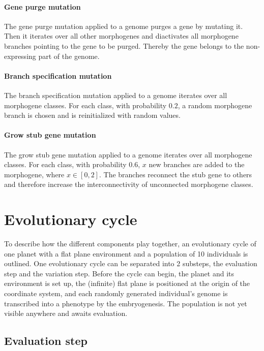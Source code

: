 \documentclass[main]{subfiles}
\begin{document}
\paragraph{Gene purge mutation}

The gene purge mutation applied to a genome purges a gene by mutating it. %
%
Then it iterates over all other morphogenes and diactivates all morphogene branches pointing to the gene to be purged. %
%
Thereby the gene belongs to the non-expressing part of the genome.

\paragraph{Branch specification mutation}

The branch specification mutation applied to a genome iterates over all morphogene classes. %
%
For each class, with probability $0.2$, a random morphogene branch is chosen and is reinitialized with random values. 

\paragraph{Grow stub gene mutation}

The grow stub gene mutation applied to a genome iterates over all morphogene classes. %
%
For each class, with probability $0.6$, $x$ new branches are added to the morphogene, where $x \in [0,2]$. %
%
The branches reconnect the stub gene to others and therefore increase the interconnectivity of unconnected morphogene classes.

\section{Evolutionary cycle}

To describe how the different components play together, an evolutionary cycle of one planet with a flat plane environment and a population of 10 individuals is outlined. %
%
One evolutionary cycle can be separated into 2 substeps, the evaluation step and the variation step. %
%
Before the cycle can begin, the planet and its environment is set up, the (infinite) flat plane is positioned at the origin of the coordinate system, and each randomly generated individual's genome is transcribed into a phenotype by the embryogenesis. %
%
The population is not yet visible anywhere and awaits evaluation.

\subsection{Evaluation step}
\end{document}

